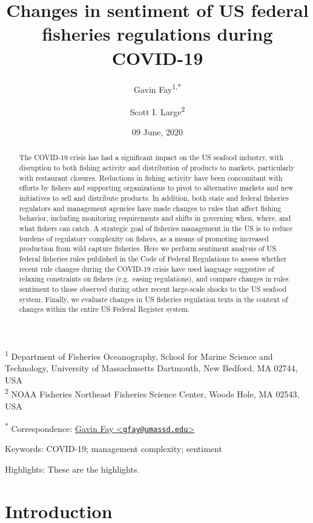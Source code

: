 \documentclass[
]{article}
\title{Changes in sentiment of US federal fisheries regulations during COVID-19}
\author{Gavin Fay\textsuperscript{1,*} \and Scott I. Large\textsuperscript{2}}
\date{09 June, 2020}
\begin{document}
\maketitle
\begin{abstract}
The COVID-19 crisis has had a significant impact on the US seafood industry, with disruption to both fishing activity and distribution of products to markets, particularly with restaurant closures. Reductions in fishing activity have been concomitant with efforts by fishers and supporting organizations to pivot to alternative markets and new initiatives to sell and distribute products. In addition, both state and federal fisheries regulators and management agencies have made changes to rules that affect fishing behavior, including monitoring requirements and shifts in governing when, where, and what fishers can catch. A strategic goal of fisheries management in the US is to reduce burdens of regulatory complexity on fishers, as a means of promoting increased production from wild capture fisheries. Here we perform sentiment analysis of US federal fisheries rules published in the Code of Federal Regulations to assess whether recent rule changes during the COVID-19 crisis have used language suggestive of relaxing constraints on fishers (e.g.~easing regulations), and compare changes in rules sentiment to those observed during other recent large-scale shocks to the US seafood system. Finally, we evaluate changes in US fisheries regulation texts in the context of changes within the entire US Federal Register system.
\end{abstract}

{
\setcounter{tocdepth}{2}
\tableofcontents
}
\textsuperscript{1} Department of Fisheries Oceanography, School for Marine Science and Technology, University of Massachusetts Dartmouth, New Bedford, MA 02744, USA\\
\textsuperscript{2} NOAA Fisheries Northeast Fisheries Science Center, Woods Hole, MA 02543, USA

\textsuperscript{*} Correspondence: \href{mailto:gfay@umassd.edu}{Gavin Fay \textless{}\href{mailto:gfay@umassd.edu}{\nolinkurl{gfay@umassd.edu}}\textgreater{}}

Keywords: COVID-19; management complexity; sentiment

Highlights: These are the highlights.

\hypertarget{introduction}{%
\section{Introduction}\label{introduction}}
\end{document}
